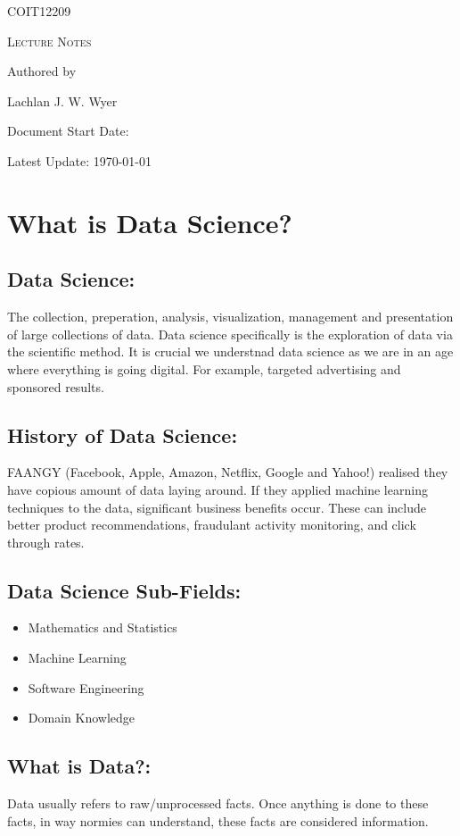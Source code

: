 \documentclass[a5paper]{article}
\date{18\textsuperscript{th} of June 2026}
\begin{document}
	\begin{titlepage}
		\centering
		{\Huge \textsc{COIT12209}\par}
		\vspace{1cm}
		{\Large \textsc{Lecture Notes}\par}
		\vspace{2.5cm}
		\vfill
		Authored by\par
		Lachlan J. W. Wyer
		\vfill
		\makeatletter
		{\large Document Start Date: \@date \par}
		\makeatother
		{\large Latest Update: \today\par}
	\end{titlepage}
	\tableofcontents
	\pagebreak

	\section{What is Data Science?}
	\subsection{Data Science:}
	The collection, preperation, analysis, visualization, management and presentation of large collections of data. Data science specifically is the exploration of data via the scientific method. It  is crucial we understnad data science as we are in an age where everything is going digital. For example, targeted advertising and sponsored results.
	\subsection{History of Data Science:}
	FAANGY (Facebook, Apple, Amazon, Netflix, Google and Yahoo!) realised they have copious amount of data laying around. If they applied machine lear\-ning techniques to the data, significant business benefits occur. These can include better product recommendations, fraudulant activity monitoring, and click through rates.
	\subsection{Data Science Sub-Fields:}
	\begin{itemize}
		\item Mathematics and Statistics
		\item Machine Learning
		\item Software Engineering
		\item Domain Knowledge
	\end{itemize}
	\subsection{What is Data?:}
	Data usually refers to raw/unprocessed facts. Once anything is done to these facts, in way normies can understand, these facts are considered information.
\end{document}
